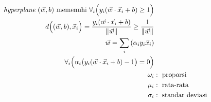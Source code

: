 \documentclass[]{article}
\begin{document}
  \begin{align*}
    \text{\textit{hyperplane} }(\vec w,b)\text{ memenuhi } \forall_i\Big(y_i(\vec w\cdot\vec x_i+b) \geq 1\Big) \\
    d\Big((\vec w,b),\vec x_i\Big) =
    \frac{y_i(\vec w\cdot\vec x_i+b)}{\Vert\vec w\Vert} \geq
    \frac{1}{\Vert\vec w\Vert} \\
    \vec w = \sum_i{(\alpha_iy_i\vec x_i)} \\
    \forall_i\Big(\alpha_i\big(y_i(\vec w\cdot\vec x_i+b) - 1\big) = 0\Big) \\
    \omega_i&:\text{ proporsi} \\
    \mu_i&:\text{ rata-rata} \\
    \sigma_i&:\text{ standar deviasi} \\
  \end{align*}
\end{document}
